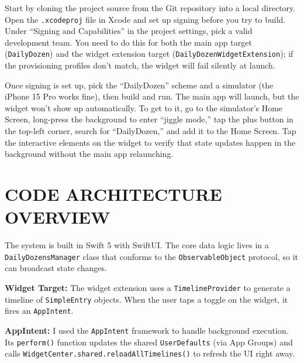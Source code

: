 \documentclass[10pt,twocolumn]{article}
\begin{document}
Start by cloning the project source from the Git repository into a local directory. Open the \texttt{.xcodeproj} file in Xcode and set up signing before you try to build. Under ``Signing and Capabilities'' in the project settings, pick a valid development team. You need to do this for both the main app target (\texttt{DailyDozen}) and the widget extension target (\texttt{DailyDozenWidgetExtension}); if the provisioning profiles don't match, the widget will fail silently at launch.

Once signing is set up, pick the ``DailyDozen'' scheme and a simulator (the iPhone 15 Pro works fine), then build and run. The main app will launch, but the widget won't show up automatically. To get to it, go to the simulator's Home Screen, long-press the background to enter ``jiggle mode,'' tap the plus button in the top-left corner, search for ``DailyDozen,'' and add it to the Home Screen. Tap the interactive elements on the widget to verify that state updates happen in the background without the main app relaunching.

\section{CODE ARCHITECTURE OVERVIEW}

The system is built in Swift 5 with SwiftUI. The core data logic lives in a \texttt{DailyDozensManager} class that conforms to the \texttt{ObservableObject} protocol, so it can broadcast state changes.

\noindent\textbf{Widget Target:} The widget extension uses a \texttt{TimelineProvider} to generate a timeline of \texttt{SimpleEntry} objects. When the user taps a toggle on the widget, it fires an \texttt{AppIntent}.

\noindent\textbf{AppIntent:} I used the \texttt{AppIntent} framework to handle background execution. Its \texttt{perform()} function updates the shared \texttt{UserDefaults} (via App Groups) and calls \texttt{WidgetCenter.shared.reloadAllTimelines()} to refresh the UI right away.

\printbibliography
\end{document}
